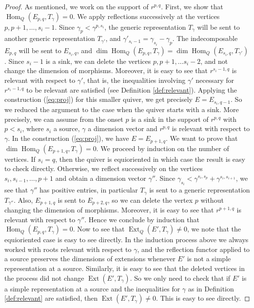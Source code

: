 \documentclass[twoside]{article}
\newcommand{\Hom}{\operatorname{Hom}}
\newcommand{\Ext}{\operatorname{Ext}}
\theoremstyle{definition}
\begin{document}
\begin{proof}
As mentioned, we work on the support of $r^{p,q}$. First, we show that $\Hom_Q(E_{p,q},T_{\gamma})=0$. We apply reflections successively at the vertices $p,p+1,\dots ,s_{i}-1$. Since $\gamma_p<\gamma^{p,s_i}$, the generic representation $T_\gamma$ will be sent to another generic representation $T_{\gamma'}$, and $\gamma'_{s_{i}-1}=\gamma_{s_i}-\gamma_p$. The indecomposable $E_{p,q}$ will be sent to $E_{s_i,q}$, and $\dim \Hom_Q(E_{p,q},T_\gamma)=\dim\Hom_Q(E_{s_i,q},T_{\gamma'})$. Since $s_{i}-1$ is a sink, we can delete the vertices $p,p+1,\dots s_{i}-2$, and not change the dimension of morphisms. Moreover, it is easy to see that $r^{s_i-1,q}$ is relevant with respect to $\gamma'$, that is, the inequalities involving $\gamma'$ necessary for $r^{s_i-1,q}$ to be relevant are satisfied (see Definition \ref{def:relevant}). Applying the construction (\ref{eq:proj}) for this smaller quiver, we get precisely $E=E_{s_i,q-1}$. So we reduced the argument to the case when the quiver starts with a sink. More precisely, we can assume from the onset $p$ is a sink in the support of $r^{p,q}$ with $ p<s_i$, where $s_i$ a source, $\gamma$ a dimension vector and $r^{p,q}$ is relevant with respect to $\gamma$. In the construction (\ref{eq:proj}), we have $E=E_{p+1,q}$. We want to prove that $\dim\Hom_Q(E_{p+1,q},T_\gamma)=0$. We proceed by induction on the number of vertices. If $s_i=q$, then the quiver is equioriented in which case the result is easy to check directly. Otherwise, we reflect successively on the vertices $s_i,s_{i-1},\dots, p+1$ and obtain a dimension vector $\gamma''$. Since $\gamma_{s_{i}}<\gamma^{s_{i},s_{p}}+\gamma^{s_{i},s_{i+1}}$, we see that $\gamma''$ has positive entries, in particular $T_\gamma$ is sent to a generic representation $T_{\gamma''}$. Also, $E_{p+1,q}$ is sent to $E_{p+2,q}$, so we can delete the vertex $p$ without changing the dimension of morphisms. Moreover, it is easy to see that $r^{p+1,q}$ is relevant with respect to $\gamma''$. Hence we conclude by induction that $\Hom_Q(E_{p,q},T_{\gamma})=0$. Now to see that $\Ext_Q(E',T_{\gamma})\neq 0$, we note that the equioriented case is easy to see directly. In the induction process above we always worked with roots relevant with respect to $\gamma$, and the reflection functor applied to a source preserves the dimensions of extensions whenever $E'$ is not a simple representation at a source. Similarly, it is easy to see that the deleted vertices in the process did not change $\Ext(E',T_\gamma)$. So we only need to check that if $E'$ is a simple representation at a source and the inequalities for $\gamma$ as in Definition \ref{def:relevant} are satisfied, then $\Ext(E',T_\gamma)\neq 0$. This is easy to see directly.


\end{proof}
\end{document}
